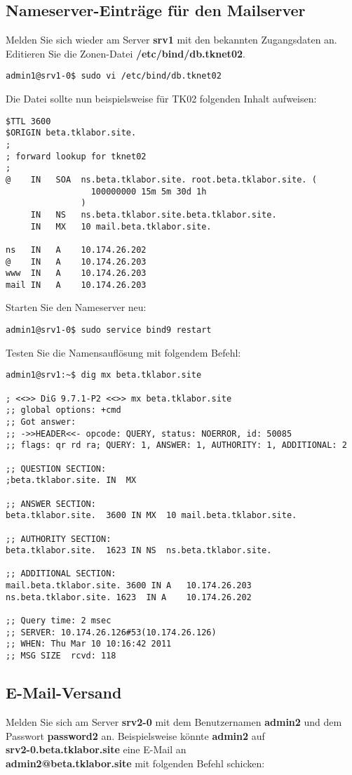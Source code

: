 \subsection{Nameserver-Einträge für den Mailserver}
Melden Sie 
sich wieder am Server \textbf{srv1} mit den bekannten Zugangsdaten an. Editieren Sie die Zonen-Datei \textbf{/etc/bind/db.tknet02}.
\begin{lstlisting}
admin1@srv1-0$ sudo vi /etc/bind/db.tknet02
\end{lstlisting}
Die Datei sollte nun beispielsweise für TK02 folgenden Inhalt aufweisen:
\scriptsize\begin{lstlisting}
$TTL 3600
$ORIGIN beta.tklabor.site.
;
; forward lookup for tknet02
;
@    IN   SOA  ns.beta.tklabor.site. root.beta.tklabor.site. ( 
                 100000000 15m 5m 30d 1h 
               )
     IN   NS   ns.beta.tklabor.site.beta.tklabor.site.
     IN   MX   10 mail.beta.tklabor.site.

ns   IN   A    10.174.26.202
@    IN   A    10.174.26.203
www  IN   A    10.174.26.203
mail IN   A    10.174.26.203
\end{lstlisting}
\normalsize Starten Sie den Nameserver neu:
\begin{lstlisting}
admin1@srv1-0$ sudo service bind9 restart
\end{lstlisting}
Testen Sie die Namensauflösung mit folgendem Befehl:
\begin{lstlisting}
admin1@srv1:~$ dig mx beta.tklabor.site

; <<>> DiG 9.7.1-P2 <<>> mx beta.tklabor.site
;; global options: +cmd
;; Got answer:
;; ->>HEADER<<- opcode: QUERY, status: NOERROR, id: 50085
;; flags: qr rd ra; QUERY: 1, ANSWER: 1, AUTHORITY: 1, ADDITIONAL: 2

;; QUESTION SECTION:
;beta.tklabor.site.	IN	MX

;; ANSWER SECTION:
beta.tklabor.site.	3600 IN	MX	10 mail.beta.tklabor.site.

;; AUTHORITY SECTION:
beta.tklabor.site.	1623 IN	NS	ns.beta.tklabor.site.

;; ADDITIONAL SECTION:
mail.beta.tklabor.site. 3600 IN A	10.174.26.203
ns.beta.tklabor.site. 1623	IN A	10.174.26.202

;; Query time: 2 msec
;; SERVER: 10.174.26.126#53(10.174.26.126)
;; WHEN: Thu Mar 10 10:16:42 2011
;; MSG SIZE  rcvd: 118
\end{lstlisting}
\subsection{E-Mail-Versand}
Melden Sie sich am Server \textbf{srv2-0} mit dem Benutzernamen \textbf{admin2}
und dem Passwort \textbf{password2} an. Beispielsweise könnte \textbf{admin2}
auf
\\
\textbf{srv2-0.beta.tklabor.site} eine E-Mail an \\
\textbf{admin2@beta.tklabor.site} mit folgenden Befehl schicken:

